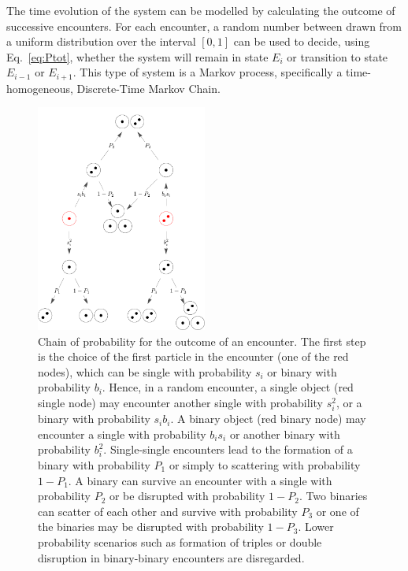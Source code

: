 \documentclass[a4paper,12pt]{article}
\begin{document}
The time evolution of the system can be modelled by calculating the outcome of successive encounters. For each encounter, a random number between drawn from a uniform distribution over the interval $[0,1]$ can be used to decide, using Eq.~\eqref{eq:Ptot}, whether the system will remain in state $E_i$ or transition to state $E_{i-1}$ or $E_{i+1}$. This type of system is a Markov process, specifically a time-homogeneous, Discrete-Time Markov Chain. 

\begin{figure}
\centering
\includegraphics[width=0.5\textwidth]{ProbabilityChain}
\caption{\label{fig:chain_of_probability}
Chain of probability for the outcome of an encounter.  The first step is the choice of the first particle in the encounter (one of the red nodes), which can be single with probability $s_i$ or binary with probability $b_i$.  Hence, in a random encounter, a single object (red single node) may encounter another single with probability $s_i^2$, or a binary with probability $s_i b_i$.  A binary object (red binary node) may encounter a single with probability $b_i s_i$ or another binary with probability $b_i^2$. Single-single encounters lead to the formation of a binary with probability $P_1$ or simply to scattering with probability $1-P_1$.  A binary can survive an encounter with a single with probability $P_2$ or be disrupted with probability $1-P_2$.  Two binaries can scatter of each other and survive with probability $P_3$ or one of the binaries may be disrupted with probability $1-P_3$.  Lower probability scenarios such as formation of triples or double disruption in binary-binary encounters are disregarded.}
\end{figure}
\end{document}
